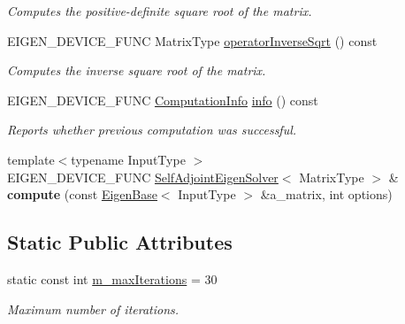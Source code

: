 \begin{DoxyCompactItemize}
\begin{DoxyCompactList}\small\item\em Computes the positive-\/definite square root of the matrix. \end{DoxyCompactList}\item 
E\+I\+G\+E\+N\+\_\+\+D\+E\+V\+I\+C\+E\+\_\+\+F\+U\+NC Matrix\+Type \mbox{\hyperlink{class_eigen_1_1_self_adjoint_eigen_solver_a71fe0aea0b22d176efcea556c5c160f5}{operator\+Inverse\+Sqrt}} () const
\begin{DoxyCompactList}\small\item\em Computes the inverse square root of the matrix. \end{DoxyCompactList}\item 
E\+I\+G\+E\+N\+\_\+\+D\+E\+V\+I\+C\+E\+\_\+\+F\+U\+NC \mbox{\hyperlink{group__enums_ga85fad7b87587764e5cf6b513a9e0ee5e}{Computation\+Info}} \mbox{\hyperlink{class_eigen_1_1_self_adjoint_eigen_solver_a56bd59b85a6f6f00ff7bff307ad0e015}{info}} () const
\begin{DoxyCompactList}\small\item\em Reports whether previous computation was successful. \end{DoxyCompactList}\item 
\mbox{\label{class_eigen_1_1_self_adjoint_eigen_solver_ac395e416bcc6cfd9c9250a54abe5a6d0}} 
{\footnotesize template$<$typename Input\+Type $>$ }\\E\+I\+G\+E\+N\+\_\+\+D\+E\+V\+I\+C\+E\+\_\+\+F\+U\+NC \mbox{\hyperlink{class_eigen_1_1_self_adjoint_eigen_solver}{Self\+Adjoint\+Eigen\+Solver}}$<$ Matrix\+Type $>$ \& {\bfseries compute} (const \mbox{\hyperlink{struct_eigen_1_1_eigen_base}{Eigen\+Base}}$<$ Input\+Type $>$ \&a\+\_\+matrix, int options)
\end{DoxyCompactItemize}
\subsection*{Static Public Attributes}
\begin{DoxyCompactItemize}
\item 
static const int \mbox{\hyperlink{class_eigen_1_1_self_adjoint_eigen_solver_a9ba10b83f095b18dbea345db7304acfa}{m\+\_\+max\+Iterations}} = 30
\begin{DoxyCompactList}\small\item\em Maximum number of iterations. \end{DoxyCompactList}\end{DoxyCompactItemize}

